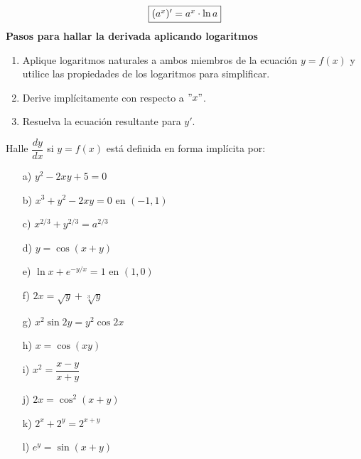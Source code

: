 \documentclass[10pt,twoside]{SelfArx} %
\begin{document}
\begin{equation}
\fbox{$ (a^{x})'=a^{x}\cdot \ln a $}
\end{equation}
\textbf{Pasos para hallar la derivada aplicando logaritmos}\\
\begin{enumerate}
	\item Aplique logaritmos naturales a ambos miembros de la ecuación $ y=f(x) $ y utilice las propiedades de los logaritmos para simplificar.
	\item Derive impl\'icitamente con respecto a $ "x"$.
	\item Resuelva la ecuación resultante para $ y' $.
\end{enumerate}
Halle $ \dfrac{dy}{dx} $ si $ y=f(x) $ está definida en forma implícita por:
\begin{enumerate}
	\item[a)] $ y^{2}-2xy+5=0 $
	\item [b)]$ x^{3}+y^{2}-2xy=0 $ en $ (-1,1) $
	\item [c)]$ x^{2/3}+y^{2/3}=a^{2/3} $
	\item [d)]$ y=\cos(x+y) $
	\item [e)] $ \ln x+e^{-y/x}=1  $ en $ (1,0) $
	\item [f)] $ 2x=\sqrt{y}+\sqrt[3]{y} $
	\item [g)] $ x^{2}\sin2y=y^{2}\cos2x $
	\item [h)] $ x=\cos (xy) $
	\item  [i)] $ x^{2}=\dfrac{x-y}{x+y} $
	\item [j)] $ 2x=\cos^{2}(x+y) $
	\item [k)] $ 2^{x}+2^{y}=2^{x+y} $
	\item [l)] $ e^{y} = \sin(x+y )$
\end{enumerate}
\end{document}
